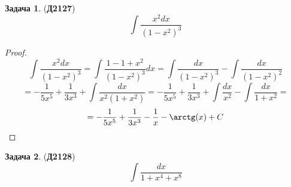 \documentclass[12pt]{article}
\theoremstyle{definition}
\newtheorem{problem}{Задача}
\DeclareMathOperator{\dint}{\displaystyle\int}
\begin{document}
\begin{problem}(\textbf{Д2127})
	$$
		\dint \dfrac{x^2dx}{(1-x^2)^3}
	$$
\end{problem}
\begin{proof}
	$$
		\dint \dfrac{x^2dx}{(1-x^2)^3} = \dint \dfrac{ 1 - 1 + x^2}{(1-x^2)^3}dx = \dint \dfrac{dx}{(1 -x^2)^3} - \dint \dfrac{dx}{(1 - x^2)^2}
	$$
	$$
	= -\dfrac{1}{5x^5} + \dfrac{1}{3x^3} + \dint\dfrac{dx}{x^2(1 + x^2)} = -\dfrac{1}{5x^5} + \dfrac{1}{3x^3} + \dint\dfrac{dx}{x^2} - \dint\dfrac{dx}{ 1 + x^2} = 
	$$
	$$
	= -\dfrac{1}{5x^5} + \dfrac{1}{3x^3} - \dfrac{1}{x} - \arctg(x) + C
	$$
\end{proof}

\begin{problem}(\textbf{Д2128})
	$$
		\dint \dfrac{dx}{1 + x^4 + x^8}
	$$
\end{problem}
\end{document}
